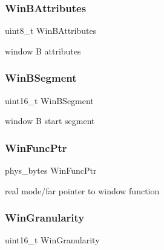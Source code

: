 \subsubsection{\texorpdfstring{Win\+B\+Attributes}{WinBAttributes}}
{\footnotesize\ttfamily uint8\+\_\+t Win\+B\+Attributes}



window B attributes 

\hypertarget{structvbe__mode__info__t_a9edf422a931df7c7a1d5f82afb911566}{}\label{structvbe__mode__info__t_a9edf422a931df7c7a1d5f82afb911566} 
\subsubsection{\texorpdfstring{Win\+B\+Segment}{WinBSegment}}
{\footnotesize\ttfamily uint16\+\_\+t Win\+B\+Segment}



window B start segment 

\hypertarget{structvbe__mode__info__t_affd250a4766543099f253e27af3abc35}{}\label{structvbe__mode__info__t_affd250a4766543099f253e27af3abc35} 
\subsubsection{\texorpdfstring{Win\+Func\+Ptr}{WinFuncPtr}}
{\footnotesize\ttfamily phys\+\_\+bytes Win\+Func\+Ptr}



real mode/far pointer to window function 

\hypertarget{structvbe__mode__info__t_a38f205f799c6929629395f03e24de077}{}\label{structvbe__mode__info__t_a38f205f799c6929629395f03e24de077} 
\subsubsection{\texorpdfstring{Win\+Granularity}{WinGranularity}}
{\footnotesize\ttfamily uint16\+\_\+t Win\+Granularity}



